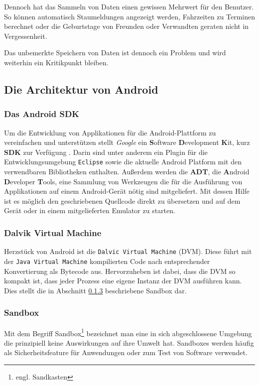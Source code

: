 Dennoch hat das Sammeln von Daten einen gewissen Mehrwert für den Benutzer. So können automatisch Staumeldungen angezeigt werden, Fahrzeiten zu Terminen berechnet oder die Geburtstage von Freunden oder Verwandten geraten nicht in Vergessenheit.

Das unbemerkte Speichern von Daten ist dennoch ein Problem und wird weiterhin ein Kritikpunkt bleiben.

\subsection{Die Architektur von Android}

\subsubsection{Das Android SDK}

Um die Entwicklung von Applikationen für die Android-Plattform zu vereinfachen und unterstützen stellt \emph{Google} ein \textbf{S}oftware \textbf{D}evelopment \textbf{K}it, kurz \textbf{SDK} zur Verfügung \cite{android_sdk}. Darin sind unter anderem ein Plugin für die Entwicklungsumgebung \verb+Eclipse+ sowie die aktuelle Android Platform mit den verwendbaren Bibliotheken enthalten. Außerdem werden die \textbf{ADT}, die \textbf{A}ndroid \textbf{D}eveloper \textbf{T}ools, eine Sammlung von Werkzeugen die für die Ausführung von Applikationen auf einem Android-Gerät nötig sind mitgeliefert. Mit dessen Hilfe ist es möglich den geschriebenen Quellcode direkt zu übersetzen und auf dem Gerät oder in einem mitgelieferten Emulator zu starten.

\subsubsection{Dalvik Virtual Machine}
Herzstück von Android ist die \verb+Dalvic Virtual Machine+ (DVM). Diese führt mit der \verb+Java Virtual Machine+ kompilierten Code nach entsprechender Konvertierung als Bytecode aus. Hervorzuheben ist dabei, dass die DVM so kompakt ist, dass jeder Prozess eine eigene Instanz der DVM ausführen kann. Dies stellt die in Abschnitt \ref{sandbox} beschriebene Sandbox dar.

\subsubsection{Sandbox}
\label{sandbox}
Mit dem Begriff Sandbox\footnote{engl. Sandkasten} bezeichnet man eine in sich abgeschlossene Umgebung die prinzipiell keine Auswirkungen auf ihre Umwelt hat. Sandboxes werden häufig als Sicherheitsfeature für Anwendungen oder zum Test von Software verwendet.


